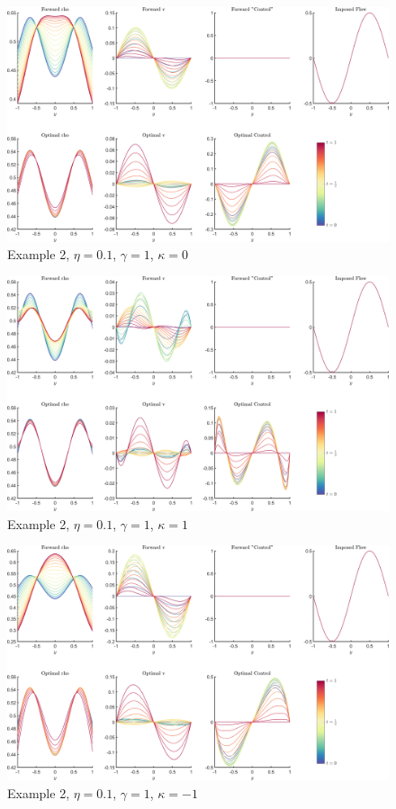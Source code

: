\documentclass[11pt, a4paper]{article}
\theoremstyle{definition}
\begin{document}
	
	\begin{figure}[h]
		\centering
		\includegraphics[scale=0.04]{Example2a.png}
		\caption{Example 2, $\eta = 0.1$, $\gamma = 1$, $\kappa = 0$} 
		\label{F4}
	\end{figure}
\begin{figure}[h]
	\centering
	\includegraphics[scale=0.04]{Example211.png}
	\caption{Example 2, $\eta = 0.1$, $\gamma = 1$, $\kappa = 1$} 
	\label{F4a}
\end{figure}
\begin{figure}[h]
	\centering
	\includegraphics[scale=0.04]{Example21n1.png}
	\caption{Example 2, $\eta = 0.1$, $\gamma = 1$, $\kappa = -1$} 
	\label{F4b}
\end{figure}
\end{document}
